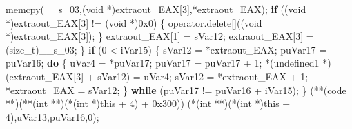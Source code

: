 \documentclass[
]{article}
\newenvironment{Shaded}{}{}
\newcommand{\BaseNTok}[1]{\textcolor[rgb]{0.25,0.63,0.44}{#1}}
\newcommand{\ControlFlowTok}[1]{\textcolor[rgb]{0.00,0.44,0.13}{\textbf{#1}}}
\newcommand{\DataTypeTok}[1]{\textcolor[rgb]{0.56,0.13,0.00}{#1}}
\newcommand{\DecValTok}[1]{\textcolor[rgb]{0.25,0.63,0.44}{#1}}
\newcommand{\NormalTok}[1]{#1}
\newcommand{\OperatorTok}[1]{\textcolor[rgb]{0.40,0.40,0.40}{#1}}
\begin{document}
\begin{Shaded}
\begin{Highlighting}[]
\NormalTok{        memcpy}\OperatorTok{(}\NormalTok{\_\_s\_03}\OperatorTok{,(}\DataTypeTok{void} \OperatorTok{*)}\NormalTok{extraout\_EAX}\OperatorTok{[}\DecValTok{3}\OperatorTok{],*}\NormalTok{extraout\_EAX}\OperatorTok{);}
        \ControlFlowTok{if} \OperatorTok{((}\DataTypeTok{void} \OperatorTok{*)}\NormalTok{extraout\_EAX}\OperatorTok{[}\DecValTok{3}\OperatorTok{]} \OperatorTok{!=} \OperatorTok{(}\DataTypeTok{void} \OperatorTok{*)}\BaseNTok{0x0}\OperatorTok{)} \OperatorTok{\{}
\NormalTok{          operator}\OperatorTok{.}\NormalTok{delete}\OperatorTok{[]((}\DataTypeTok{void} \OperatorTok{*)}\NormalTok{extraout\_EAX}\OperatorTok{[}\DecValTok{3}\OperatorTok{]);}
        \OperatorTok{\}}
\NormalTok{        extraout\_EAX}\OperatorTok{[}\DecValTok{1}\OperatorTok{]} \OperatorTok{=}\NormalTok{ sVar12}\OperatorTok{;}
\NormalTok{        extraout\_EAX}\OperatorTok{[}\DecValTok{3}\OperatorTok{]} \OperatorTok{=} \OperatorTok{(}\DataTypeTok{size\_t}\OperatorTok{)}\NormalTok{\_\_s\_03}\OperatorTok{;}
      \OperatorTok{\}}
      \ControlFlowTok{if} \OperatorTok{(}\DecValTok{0} \OperatorTok{\textless{}}\NormalTok{ iVar15}\OperatorTok{)} \OperatorTok{\{}
\NormalTok{        sVar12 }\OperatorTok{=} \OperatorTok{*}\NormalTok{extraout\_EAX}\OperatorTok{;}
\NormalTok{        puVar17 }\OperatorTok{=}\NormalTok{ puVar16}\OperatorTok{;}
        \ControlFlowTok{do} \OperatorTok{\{}
\NormalTok{          uVar4 }\OperatorTok{=} \OperatorTok{*}\NormalTok{puVar17}\OperatorTok{;}
\NormalTok{          puVar17 }\OperatorTok{=}\NormalTok{ puVar17 }\OperatorTok{+} \DecValTok{1}\OperatorTok{;}
          \OperatorTok{*(}\NormalTok{undefined1 }\OperatorTok{*)(}\NormalTok{extraout\_EAX}\OperatorTok{[}\DecValTok{3}\OperatorTok{]} \OperatorTok{+}\NormalTok{ sVar12}\OperatorTok{)} \OperatorTok{=}\NormalTok{ uVar4}\OperatorTok{;}
\NormalTok{          sVar12 }\OperatorTok{=} \OperatorTok{*}\NormalTok{extraout\_EAX }\OperatorTok{+} \DecValTok{1}\OperatorTok{;}
          \OperatorTok{*}\NormalTok{extraout\_EAX }\OperatorTok{=}\NormalTok{ sVar12}\OperatorTok{;}
        \OperatorTok{\}} \ControlFlowTok{while} \OperatorTok{(}\NormalTok{puVar17 }\OperatorTok{!=}\NormalTok{ puVar16 }\OperatorTok{+}\NormalTok{ iVar15}\OperatorTok{);}
      \OperatorTok{\}}
      \OperatorTok{(**(}\NormalTok{code }\OperatorTok{**)(**(}\DataTypeTok{int} \OperatorTok{**)(*(}\DataTypeTok{int} \OperatorTok{*)}\NormalTok{this }\OperatorTok{+} \DecValTok{4}\OperatorTok{)} \OperatorTok{+} \BaseNTok{0x300}\OperatorTok{))}
                \OperatorTok{(*(}\DataTypeTok{int} \OperatorTok{**)(*(}\DataTypeTok{int} \OperatorTok{*)}\NormalTok{this }\OperatorTok{+} \DecValTok{4}\OperatorTok{),}\NormalTok{uVar13}\OperatorTok{,}\NormalTok{puVar16}\OperatorTok{,}\DecValTok{0}\OperatorTok{);}

\end{Highlighting}
\end{Shaded}
\end{document}

